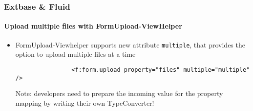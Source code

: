 
\begin{frame}[fragile]
	\frametitle{Extbase \& Fluid}
	\framesubtitle{Upload multiple files with FormUpload-ViewHelper}

	\begin{itemize}

		\item FormUpload-Viewhelper supports new attribute \texttt{multiple}, that provides the
			option to upload multiple files at a time

			\begin{lstlisting}
				<f:form.upload property="files" multiple="multiple" />
			\end{lstlisting}

			\vspace{0.2cm}

			\begingroup
				\color{red}
					Note: developers need to prepare the incoming value for the property mapping by
					writing their own TypeConverter!
			\endgroup

	\end{itemize}

\end{frame}

